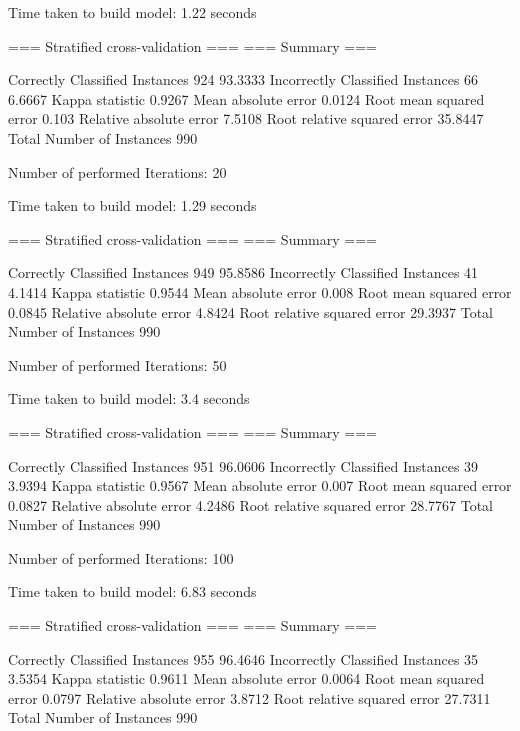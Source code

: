 Time taken to build model: 1.22 seconds

=== Stratified cross-validation ===
=== Summary ===

Correctly Classified Instances         924               93.3333 %
Incorrectly Classified Instances        66                6.6667 %
Kappa statistic                          0.9267
Mean absolute error                      0.0124
Root mean squared error                  0.103 
Relative absolute error                  7.5108 %
Root relative squared error             35.8447 %
Total Number of Instances              990

Number of performed Iterations: 20


Time taken to build model: 1.29 seconds

=== Stratified cross-validation ===
=== Summary ===

Correctly Classified Instances         949               95.8586 %
Incorrectly Classified Instances        41                4.1414 %
Kappa statistic                          0.9544
Mean absolute error                      0.008 
Root mean squared error                  0.0845
Relative absolute error                  4.8424 %
Root relative squared error             29.3937 %
Total Number of Instances              990

Number of performed Iterations: 50


Time taken to build model: 3.4 seconds

=== Stratified cross-validation ===
=== Summary ===

Correctly Classified Instances         951               96.0606 %
Incorrectly Classified Instances        39                3.9394 %
Kappa statistic                          0.9567
Mean absolute error                      0.007 
Root mean squared error                  0.0827
Relative absolute error                  4.2486 %
Root relative squared error             28.7767 %
Total Number of Instances              990

Number of performed Iterations: 100


Time taken to build model: 6.83 seconds

=== Stratified cross-validation ===
=== Summary ===

Correctly Classified Instances         955               96.4646 %
Incorrectly Classified Instances        35                3.5354 %
Kappa statistic                          0.9611
Mean absolute error                      0.0064
Root mean squared error                  0.0797
Relative absolute error                  3.8712 %
Root relative squared error             27.7311 %
Total Number of Instances              990

